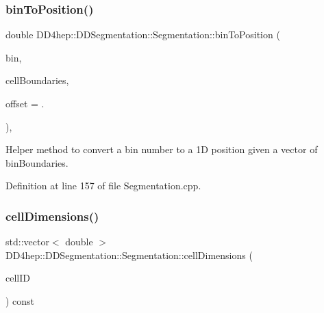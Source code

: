 \hypertarget{class_d_d4hep_1_1_d_d_segmentation_1_1_segmentation_aeb5bfa97c90cefa129ad0c5d2dcb94fc}{}\label{class_d_d4hep_1_1_d_d_segmentation_1_1_segmentation_aeb5bfa97c90cefa129ad0c5d2dcb94fc} 
\subsubsection{\texorpdfstring{bin\+To\+Position()}{binToPosition()}\hspace{0.1cm}{\footnotesize\ttfamily [2/2]}}
{\footnotesize\ttfamily double D\+D4hep\+::\+D\+D\+Segmentation\+::\+Segmentation\+::bin\+To\+Position (\begin{DoxyParamCaption}\item[{\hyperlink{namespace_d_d4hep_1_1_d_d_segmentation_ac7af071d85cb48820914434a07e21ba1}{Cell\+ID}}]{bin,  }\item[{std\+::vector$<$ double $>$ const \&}]{cell\+Boundaries,  }\item[{double}]{offset = {.} }\end{DoxyParamCaption})\hspace{0.3cm}{\ttfamily [static]}, {\ttfamily [protected]}}



Helper method to convert a bin number to a 1D position given a vector of bin\+Boundaries. 



Definition at line 157 of file Segmentation.\+cpp.

\hypertarget{class_d_d4hep_1_1_d_d_segmentation_1_1_segmentation_ac2119ba64c9805751e08b6100ef6fee6}{}\label{class_d_d4hep_1_1_d_d_segmentation_1_1_segmentation_ac2119ba64c9805751e08b6100ef6fee6} 
\subsubsection{\texorpdfstring{cell\+Dimensions()}{cellDimensions()}}
{\footnotesize\ttfamily std\+::vector$<$ double $>$ D\+D4hep\+::\+D\+D\+Segmentation\+::\+Segmentation\+::cell\+Dimensions (\begin{DoxyParamCaption}\item[{const \hyperlink{namespace_d_d4hep_1_1_d_d_segmentation_ac7af071d85cb48820914434a07e21ba1}{Cell\+ID} \&}]{cell\+ID }\end{DoxyParamCaption}) const\hspace{0.3cm}{\ttfamily [virtual]}}



